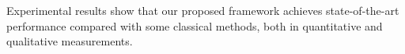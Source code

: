 \documentclass[letterpaper]{article} %
\begin{document}
Experimental results show that our proposed framework achieves state-of-the-art performance compared with some classical methods, both in quantitative and qualitative measurements.
\end{document}
